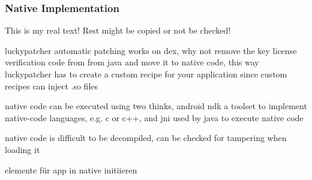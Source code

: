 \subsubsection{Native Implementation} \label{subsubsection:counter-modifications-dynamic}
This is my real text! Rest might be copied or not be checked!

luckypatcher automatic patching works on dex, why not remove the key license verification code from from java and move it to native code, this way luckypatcher has to create a custom recipe for your application since custom recipes can inject .so files

native code can be executed using two thinks, android ndk a toolset to implement native-code languages, e.g. c or c++, and  \gls{jni} used by java to execute native code

native code is difficult to be decompiled, can be checked for tampering when loading it


elemente für app in native initiieren
